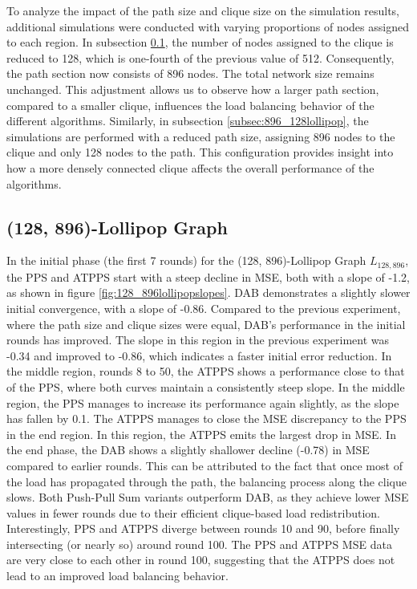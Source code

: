 To analyze the impact of the path size and clique size on the simulation results, additional simulations were conducted with varying proportions of nodes assigned to each region. In subsection \ref{subsec:128_896lollipop}, the number of nodes assigned to the clique is reduced to 128, which is one-fourth of the previous value of 512. Consequently, the path section now consists of 896 nodes. The total network size remains unchanged. This adjustment allows us to observe how a larger path section, compared to a smaller clique, influences the load balancing behavior of the different algorithms. Similarly, in subsection \ref{subsec:896_128lollipop}, the simulations are performed with a reduced path size, assigning 896 nodes to the clique and only 128 nodes to the path. This configuration provides insight into how a more densely connected clique affects the overall performance of the algorithms.

\subsection{(128, 896)-Lollipop Graph}\label{subsec:128_896lollipop}
In the initial phase (the first 7 rounds) for the (128, 896)-Lollipop Graph $L_{128,896}$, the PPS and ATPPS start with a steep decline in MSE, both with a slope of -1.2, as shown in figure \ref{fig:128_896lollipopslopes}. DAB demonstrates a slightly slower initial convergence, with a slope of -0.86. Compared to the previous experiment, where the path size and clique sizes were equal, DAB's performance in the initial rounds has improved. The slope in this region in the previous experiment was -0.34 and improved to -0.86, which indicates a faster initial error reduction. In the middle region, rounds 8 to 50, the ATPPS shows a performance close to that of the PPS, where both curves maintain a consistently steep slope. In the middle region, the PPS manages to increase its performance again slightly, as the slope has fallen by 0.1. The ATPPS manages to close the MSE discrepancy to the PPS in the end region. In this region, the ATPPS emits the largest drop in MSE. In the end phase, the DAB shows a slightly shallower decline (-0.78) in MSE compared to earlier rounds. This can be attributed to the fact that once most of the load has propagated through the path, the balancing process along the clique slows. Both Push-Pull Sum variants outperform DAB, as they achieve lower MSE values in fewer rounds due to their efficient clique-based load redistribution. Interestingly, PPS and ATPPS diverge between rounds 10 and 90, before finally intersecting (or nearly so) around round 100. The PPS and ATPPS MSE data are very close to each other in round 100, suggesting that the ATPPS does not lead to an improved load balancing behavior.

